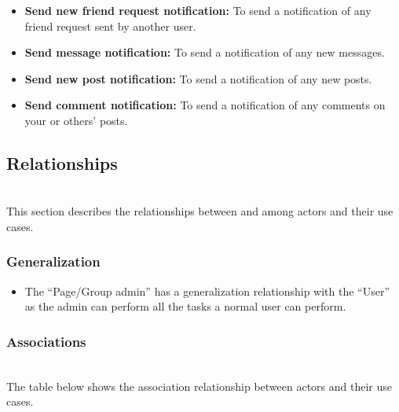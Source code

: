 \begin{itemize}
\item
\protect{}\label{g8wQR_WBYDg8GFewcfLCG}
\textbf{Send new friend request notification:} To send a notification of any friend request sent by another user.
\item
\protect{}\label{7yqOVw48IWZ8re9Jl2iPR}
\textbf{Send message notification:} To send a notification of any new messages.
\item
\protect{}\label{rHE_Rs62f21YXq_FTzfjA}
\textbf{Send new post notification:} To send a notification of any new posts.
\item
\protect{}\label{2EHlRvv3wcajt4ULCZpcx}
\textbf{Send comment notification:} To send a notification of any comments on your or others' posts.
\end{itemize}

\subsection{Relationships}\label{XQvggC3T4Ugq5zdQ2BHLs}
\\
This section describes the relationships between and among actors and their use cases.

\subsubsection{Generalization}\label{IxW9YTLIvU8ZpZHgoEimO}

\begin{itemize}
\item
\protect{}\label{qqgOqRcw5qDnU9cVfWzjr}
The ``Page/Group admin'' has a generalization relationship with the ``User'' as the admin can perform all the tasks a normal user can perform.
\end{itemize}

\subsubsection{Associations}\label{vK-QfWjvcDlR4kxAtjyB2}
\\
The table below shows the association relationship between actors and their use cases.

